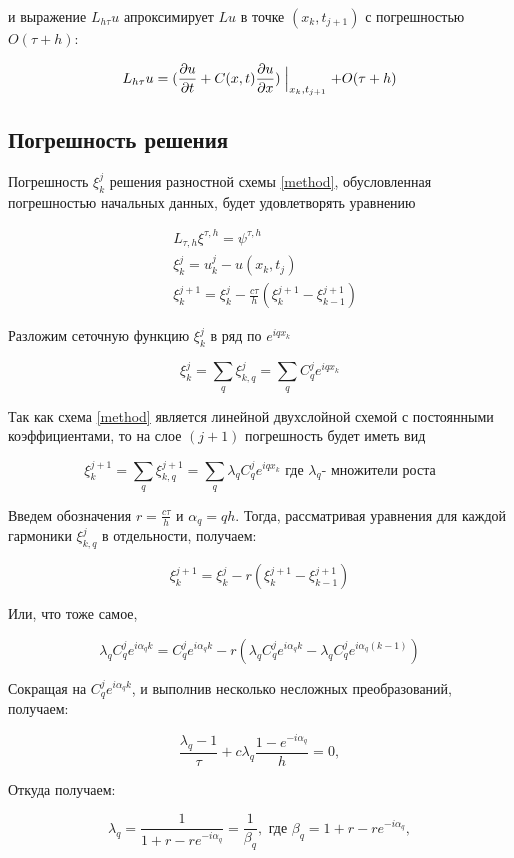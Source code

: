\documentclass[12pt,a4paper]{scrartcl}
\begin{document}
и выражение $L_{h \tau}u$ апроксимирует $Lu$ в точке $(x_k,t_{j+1})$ с погрешностью $O(\tau + h)$:

\[
	L_{h \tau}u = (	\frac{\partial u}{\partial t}+C(x,t) \frac{\partial u}{\partial x})\Bigm|_{x_k,t_{j+1}}+O(\tau+h)
\]
	
\subsection{Погрешность решения}

Погрешность $\xi^j_k $ решения разностной схемы \eqref{method}, обусловленная погрешностью начальных данных, будет удовлетворять уравнению

\begin{align*}
	&L_{\tau,h} \xi^{\tau,h} = \psi^{\tau,h}\\
	&\xi^{j}_{k} = u^{j}_k - u(x_k,t_j) \\
	&\xi^{j+1}_k = \xi^j_k - \frac{c \tau}{h}(\xi^{j+1}_k-\xi^{j+1}_{k-1})
\end{align*}
	
Разложим сеточную функцию $\xi^j_k$ в ряд по $e^{iqx_k}$

\[
	\xi^j_k = \sum_q \xi^j_{k,q}=\sum_q C_q^j e^{iqx_k}   
\]

Так как схема \eqref{method} является линейной двухслойной схемой с постоянными коэффициентами, то на слое $(j + 1)$ погрешность будет иметь вид

\[
	\xi^{j+1}_k = \sum_q \xi^{j+1}_{k,q}=\sum_q \lambda_q C_q^j e^{iqx_k} \text{ где } \lambda_q \text{- множители роста}
\]

Введем обозначения $r=\frac{c \tau}{h}$ и $\alpha_q = qh$. Тогда, рассматривая уравнения для каждой гармоники $\xi^{j}_{k,q}$ в отдельности, получаем:

\[
	\xi^{j+1}_k = \xi^j_k - r(\xi^{j+1}_k-\xi^{j+1}_{k-1})
\]

Или, что тоже самое,

\[
	\lambda_q C_q^j e^{i \alpha_q k} = C_q^j e^{i \alpha_q k}-r(\lambda_q C_q^j e^{i \alpha_q k}-\lambda_q C_q^j e^{i \alpha_q (k-1)})
\]

Сокращая на $C_q^j e^{i \alpha_q k}$, и выполнив несколько несложных преобразований, получаем:

\[
	\frac{\lambda_q -1}{\tau}+c \lambda_q \frac{1-e^{-i \alpha_q}}{h}=0,
\]

Откуда получаем:

\[
	\lambda_q = \frac{1}{1+r-re^{-i \alpha_q}}=\frac{1}{\beta_q}, \text{ где } \beta_q = 1+r-re^{-i \alpha_q}, 
\]
\end{document}
